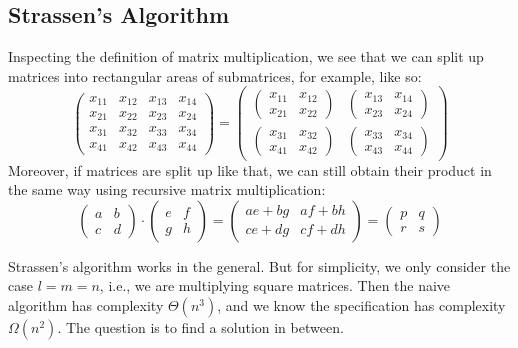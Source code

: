 \subsection{Strassen's Algorithm}

Inspecting the definition of matrix multiplication, we see that we can split up matrices into rectangular areas of submatrices, for example, like so:
\[\begin{pmatrix}x_{11} & x_{12} & x_{13} & x_{14} \\ x_{21} & x_{22} & x_{23} & x_{24} \\ x_{31} & x_{32} & x_{33} & x_{34} \\ x_{41} & x_{42} & x_{43} & x_{44}\end{pmatrix}
= \begin{pmatrix}
    \begin{pmatrix}x_{11} & x_{12}\\ x_{21} & x_{22}\end{pmatrix} & \begin{pmatrix} x_{13} & x_{14} \\ x_{23} & x_{24} \end{pmatrix} \\
    \begin{pmatrix}x_{31} & x_{32}\\ x_{41} & x_{42}\end{pmatrix} & \begin{pmatrix} x_{33} & x_{34} \\ x_{43} & x_{44} \end{pmatrix}
  \end{pmatrix}
\]
Moreover, if matrices are split up like that, we can still obtain their product in the same way using recursive matrix multiplication:
\[\begin{pmatrix} a & b \\ c & d\end{pmatrix}\cdot \begin{pmatrix} e & f \\ g & h\end{pmatrix}=
  \begin{pmatrix} ae+bg & af+bh \\ ce+dg & cf+dh\end{pmatrix}=\begin{pmatrix} p & q \\ r & s\end{pmatrix}\]

Strassen's algorithm works in the general.
But for simplicity, we only consider the case $l=m=n$, i.e., we are multiplying square matrices.
Then the naive algorithm has complexity $\Theta(n^3)$, and we know the specification has complexity $\Omega(n^2)$.
The question is to find a solution in between.

